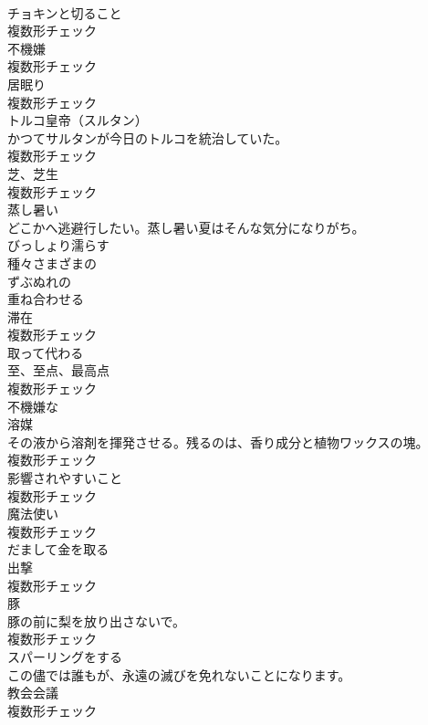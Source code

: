\documentclass[8pt]{extreport}
\begin{document}
\begin{CJK}{UTF8}{min}
\\	[名詞]	チョキンと切ること	
\\	複数形チェック
\\	[名詞]	不機嫌	
\\	複数形チェック
\\	[名詞]	居眠り	
\\	複数形チェック
\\	[名詞]	トルコ皇帝（スルタン）	
\\	かつてサルタンが今日のトルコを統治していた。	
\\	複数形チェック
\\	[名詞]	芝、芝生	
\\	複数形チェック
\\	[形容詞]	蒸し暑い	
\\	どこかへ逃避行したい。蒸し暑い夏はそんな気分になりがち。	
\\	[動詞]	びっしょり濡らす	
\\	[形容詞]	種々さまざまの	
\\	[形容詞]	ずぶぬれの	
\\	[動詞]	重ね合わせる	
\\	[名詞]	滞在	
\\	複数形チェック
\\	[動詞]	取って代わる	
\\	[名詞]	至、至点、最高点	
\\	複数形チェック
\\	[形容詞]	不機嫌な	
\\	[名詞]	溶媒	
\\	その液から溶剤を揮発させる。残るのは、香り成分と植物ワックスの塊。	
\\	複数形チェック
\\	[名詞]	影響されやすいこと	
\\	複数形チェック
\\	[名詞]	魔法使い	
\\	複数形チェック
\\	[動詞]	だまして金を取る	
\\	[名詞]	出撃	
\\	複数形チェック
\\	[名詞]	豚	
\\	豚の前に梨を放り出さないで。	
\\	複数形チェック
\\	[動詞]	スパーリングをする	
\\	この儘では誰もが、永遠の滅びを免れないことになります。	
\\	[名詞]	教会会議	
\\	複数形チェック

\end{CJK}
\end{document}
